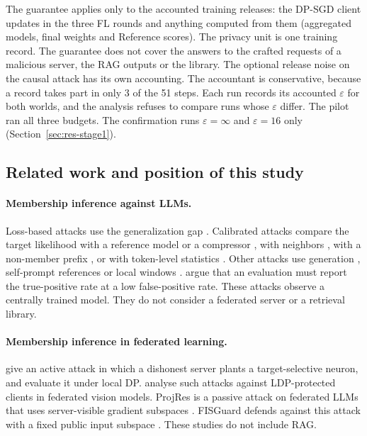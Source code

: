 \documentclass[11pt]{article}
\begin{document}
The guarantee applies only to the accounted training releases: the DP-SGD client updates in the three FL rounds and anything computed from them (aggregated models, final weights and Reference scores). The privacy unit is one training record. The guarantee does not cover the answers to the crafted requests of a malicious server, the RAG outputs or the library. The optional release noise on the causal attack has its own accounting. The accountant is conservative, because a record takes part in only 3 of the 51 steps. Each run records its accounted $\varepsilon$ for both worlds, and the analysis refuses to compare runs whose $\varepsilon$ differ. The pilot ran all three budgets. The confirmation runs $\varepsilon=\infty$ and $\varepsilon=16$ only (Section~\ref{sec:res-stage1}).

\subsection{Related work and position of this study}\label{sec:related}

\paragraph{Membership inference against LLMs.} Loss-based attacks use the generalization gap \citep{yeom2018privacy}. Calibrated attacks compare the target likelihood with a reference model or a compressor \citep{carlini2021extracting}, with neighbors \citep{mattern2023membership}, with a non-member prefix \citep{xie2024recall}, or with token-level statistics \citep{shi2024detecting,zhang2025minkpp}. Other attacks use generation \citep{kaneko2024sampling}, self-prompt references \citep{fu2024membership} or local windows \citep{chen2026window}. \citet{carlini2022first} argue that an evaluation must report the true-positive rate at a low false-positive rate. These attacks observe a centrally trained model. They do not consider a federated server or a retrieval library.

\paragraph{Membership inference in federated learning.} \citet{nguyen2023active} give an active attack in which a dishonest server plants a target-selective neuron, and evaluate it under local DP. \citet{nguyen2025theoretically} analyse such attacks against LDP-protected clients in federated vision models. ProjRes is a passive attack on federated LLMs that uses server-visible gradient subspaces \citep{deng2026projres}. FISGuard defends against this attack with a fixed public input subspace \citep{jiang2026fisguard}. These studies do not include RAG.
\end{document}
